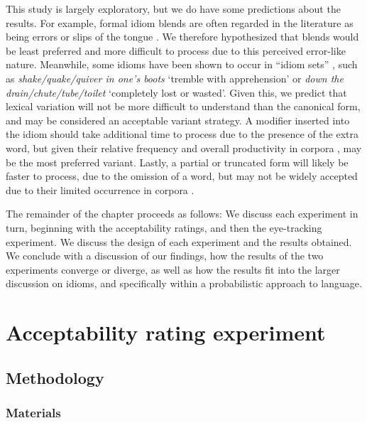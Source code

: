 \documentclass[output=paper,modfonts,nonflat]{langsci/langscibook}
\begin{document}
This study is largely exploratory, but we do have some predictions about the results. For example, formal idiom blends are often regarded in the literature as being errors or slips of the tongue \citep{Fay1982, CuttingBock1997}. We therefore hypothesized that blends would be least preferred and more difficult to process due to this perceived error-like nature. Meanwhile, some idioms have been shown to occur in ``idiom sets'' \citep{Moon1998}, such as \textit{shake/quake/quiver in one's boots} `tremble with apprehension' or \textit{down the drain/chute/tube/toilet} `completely lost or wasted'. Given this, we predict that lexical variation will not be more difficult to understand than the canonical form, and may be considered an acceptable variant strategy. A modifier inserted into the idiom should take additional time to process due to the presence of the extra word, but given their relative frequency and overall productivity in corpora \citep{Moon1998, Schroder2013}, may be the most preferred variant. Lastly, a partial or truncated form will likely be faster to process, due to the omission of a word, but may not be widely accepted due to their limited occurrence in corpora \citep{Moon1998}.

The remainder of the chapter proceeds as follows: We discuss each experiment in turn, beginning with the acceptability ratings, and then the eye-tracking experiment. We discuss the design of each experiment and the results obtained. We conclude with a discussion of our findings, how the results of the two experiments converge or diverge,  as well as how the results fit into the larger discussion on idioms, and specifically within a probabilistic approach to language.




\section{Acceptability rating experiment}

\subsection{Methodology}
\subsubsection{Materials}
\end{document}
